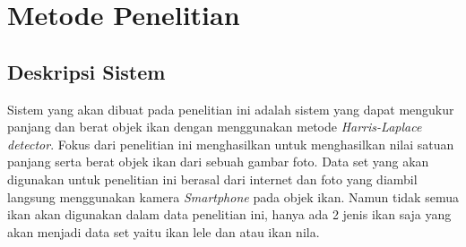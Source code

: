 
\chapter{Metode Penelitian}

\section{Deskripsi Sistem}
Sistem yang akan dibuat pada penelitian ini adalah sistem yang dapat mengukur panjang dan berat objek ikan dengan menggunakan metode \emph{Harris-Laplace detector}.
Fokus dari penelitian ini menghasilkan untuk menghasilkan nilai satuan panjang serta berat objek ikan dari sebuah gambar foto.
Data set yang akan digunakan untuk penelitian ini berasal dari internet dan foto yang diambil langsung menggunakan kamera \emph{Smartphone} pada objek ikan.  
Namun tidak semua ikan akan digunakan dalam data penelitian ini, hanya ada 2 jenis ikan saja yang akan menjadi data set yaitu ikan lele dan atau ikan nila. 
